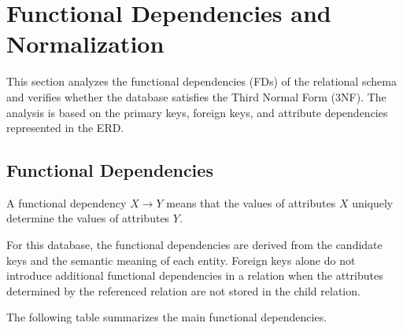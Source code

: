 
\section{Functional Dependencies and Normalization}

This section analyzes the functional dependencies (FDs) of the
relational schema and verifies whether the database satisfies the
Third Normal Form (3NF). The analysis is based on the primary keys,
foreign keys, and attribute dependencies represented in the ERD.

\subsection{Functional Dependencies}

A functional dependency $X \rightarrow Y$ means that the values of
attributes $X$ uniquely determine the values of attributes $Y$.

For this database, the functional dependencies are derived from the
candidate keys and the semantic meaning of each entity. Foreign keys
alone do not introduce additional functional dependencies in a
relation when the attributes determined by the referenced relation are
not stored in the child relation.

The following table summarizes the main functional dependencies.

